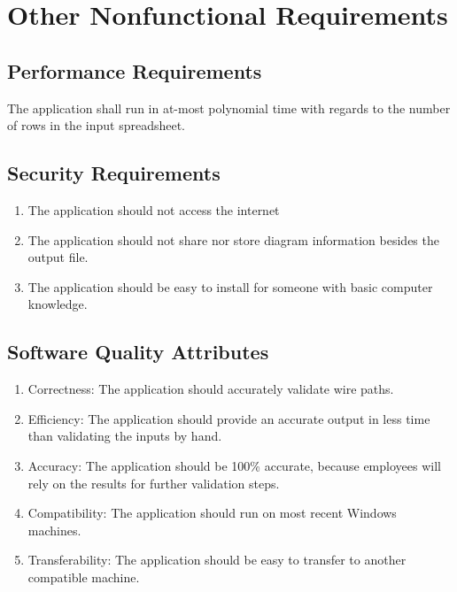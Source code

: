 \section{Other Nonfunctional Requirements}

\subsection{Performance Requirements}
The application shall run in at-most polynomial time with regards to the number of rows in the input spreadsheet.

\subsection{Security Requirements}
\begin{enumerate}
 \item The application should not access the internet
 \item The application should not share nor store diagram information besides the output file.
 \item The application should be easy to install for someone with basic computer knowledge.
\end{enumerate}


\subsection{Software Quality Attributes}
\begin{enumerate}

 \item Correctness: The application should accurately validate wire paths.
 \item Efficiency: The application should provide an accurate output in less time than validating the inputs by hand.
 \item Accuracy: The application should be 100\% accurate, because employees will rely on the results for further validation steps.
 \item Compatibility: The application should run on most recent Windows machines.
 \item Transferability: The application should be easy to transfer to another compatible machine.

\end{enumerate}






